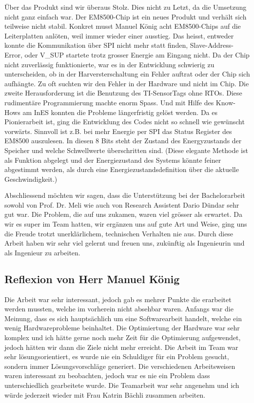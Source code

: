 Über das Produkt sind wir überaus Stolz. Dies nicht zu Letzt, da die Umsetzung nicht ganz einfach war. Der EM8500-Chip ist ein neues Produkt und verhält sich teilweise nicht stabil. Konkret musst Manuel König acht EM8500-Chips auf die Leiterplatten anlöten, weil immer wieder einer ausstieg. Das heisst, entweder konnte die Kommunikation über SPI nicht mehr statt finden, Slave-Address-Error, oder V_SUP startete trotz grosser Energie am Eingang nicht. Da der Chip nicht zuverlässig funktionierte, war es in der Entwicklung schwierig zu unterscheiden, ob in der Harversterschaltung ein Fehler auftrat oder der Chip sich aufhängte. Zu oft suchten wir den Fehler in der Hardware und nicht im Chip. Die zweite Herausforderung ist die Benutzung des TI-SensorTags ohne RTOs. Diese rudimentäre Programmierung machte enorm Spass. Und mit Hilfe des Know-Hows am InES konnten die Probleme längerfristig gelöst werden. Da es Pionierarbeit ist, ging die Entwicklung des Codes nicht so schnell wie gewünscht vorwärts. Sinnvoll ist z.B. bei mehr Energie per SPI das Status Register des EM8500 auszulesen. In diesen 8 Bits steht der Zustand des Energyzustands der Speicher und welche Schwellwerte überschritten sind. 
(Diese elegante Methode ist als Funktion abgelegt und der Energiezustand des Systems könnte feiner abgestimmt werden, als durch eine Energiezustandsdefinition über die aktuelle Geschwindigkeit.)

Abschliessend möchten wir sagen, dass die Unterstützung bei der Bachelorarbeit sowohl von Prof. Dr. Meli wie auch von Research Assistent Dario Dündar sehr gut war. Die Problem, die auf uns zukamen, waren viel grösser als erwartet. Da wir es super im Team hatten, wir ergänzen uns auf gute Art und Weise, ging uns die Freude trotzt unerklärlichem, technischen Verhalten nie aus. Durch diese Arbeit haben wir sehr viel gelernt und freuen uns, zukünftig als Ingenieurin und als Ingenieur zu arbeiten.





\subsection{Reflexion von Herr Manuel König}
Die Arbeit war sehr interessant, jedoch gab es mehrer Punkte die erarbeitet werden mussten, welche im vorherein nicht absehbar waren. Anfangs war die Meinung, dass es sich hauptsächlich um eine Softwarearbeit handelt, welche ein wenig Hardwareprobleme beinhaltet. Die Optimiertung der Hardware war sehr komplex und ich hätte gerne noch mehr Zeit für die Optimierung aufgewendet, jedoch hätten wir dann die Ziele nicht mehr erreicht. Die Arbeit im Team war sehr lösungsorientiert, es wurde nie ein Schuldiger für ein Problem gesucht, sondern immer Lösungsvorschläge generiert. Die verschiedenen Arbeitsweisen waren interessant zu beobachten, jedoch war es nie ein Problem dass unterschiedlich gearbeitete wurde. Die Teamarbeit war sehr angenehm und ich würde jederzeit wieder mit Frau Katrin Bächli zusammen arbeiten.




